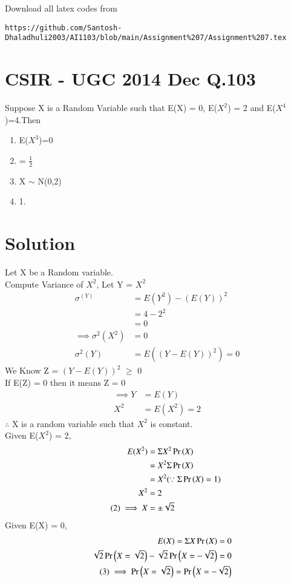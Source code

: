 \documentclass[journal,12pt,twocolumn]{IEEEtran}
\begin{document}
Download all latex codes from 
\begin{lstlisting}
https://github.com/Santosh-Dhaladhuli2003/AI1103/blob/main/Assignment%207/Assignment%207.tex
\end{lstlisting}
\section{\textbf{CSIR - UGC 2014 Dec Q.103}}
Suppose X is a Random Variable such that E(X) = 0, E($X^2$) = 2 and E($X^4$)=4.Then

\begin{enumerate}
\item  E($X^3$)=0
\item {}= $\frac{1}{2}$
\item X $\sim$ N(0,2) 
\item {} 1.
\end{enumerate}

\section{\textbf{Solution}}
Let X be a Random variable. \\
Compute Variance of $X^2$, Let Y = $X^2$
\begin{align*}
    \sigma^(Y) &= E(Y^2) - (E(Y))^{2} \\
             &=  4 - 2^2 \\
             &= 0\\
\tag{1}   \implies \sigma^2(X^2) &= 0 \\
\sigma^2(Y) &= E((Y - E(Y))^2) = 0
\end{align*}
We Know Z = $(Y - E(Y))^2$ $\ge$ 0 \\
If E(Z) = 0 then it means Z = 0 
\begin{align*}
  \implies Y &= E(Y) \\
  \tag{*}
  X^2 &= E(X^2) = 2
\end{align*}
$\therefore$ X is a random variable such that $X^2$ is constant.\\
Given E($X^2$) = 2,
\begin{align*}
    E(X^2) &= \Sigma X^2\Pr\left(X\right) \\
           &= X^2\Sigma \Pr\left(X\right)  \\
           &= X^2 (\because \Sigma \Pr\left(X\right) = 1) \\
       X^2 &= 2 \\
\tag{2} \label{X}
\implies X &= \pm \sqrt{2}
\end{align*}
Given E(X) = 0,
\begin{align*}
                      E(X) = \Sigma X\Pr\left(X\right) = 0 \\
                    \sqrt{2}\Pr\left(X = \sqrt{2}\right)-\sqrt{2}\Pr\left(X = -\sqrt{2}\right) = 0\\
      \tag{3} \label{P(X)}
\implies \Pr\left(X = \sqrt{2}\right) = \Pr\left(X = -\sqrt{2}\right)
\end{align*}
\end{document}
